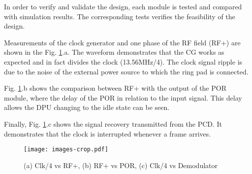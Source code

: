 In order to verify and validate the design, each module is tested and compared with simulation results. The corresponding tests verifies the feasibility of the design.

Measurements of the clock generator and one phase of the RF field (RF+) are shown in the Fig. \ref{fig:meas}.a. The waveform demonstrates that the CG works as expected and in fact divides the clock (13.56MHz/4). The clock signal ripple is due to the noise of the external power source to which the ring pad is connected. 

Fig. \ref{fig:meas}.b shows the comparison between RF+ with the output of the POR module, where the delay of the POR in relation to the input signal. This delay allows the DPU changing to the idle state can be seen.

Finally, Fig. \ref{fig:meas}.c shows the signal recovery transmitted from the PCD. It demonstrates that the clock is interrupted whenever a frame arrives.

\begin{figure}[h]
  \centering
  \texttt{[image: images-crop.pdf]}
  \caption{(a) Clk/4 vs RF+, (b) RF+ vs POR, (c) Clk/4 vs Demodulator}
  \label{fig:meas}
\end{figure}